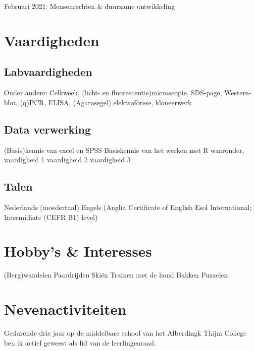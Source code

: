\documentclass[
]{book}
\begin{document}
Februari 2021: Mensenrechten \& duurzame ontwikkeling

\hypertarget{vaardigheden}{%
\section{Vaardigheden}\label{vaardigheden}}

\hypertarget{labvaardigheden}{%
\subsection{Labvaardigheden}\label{labvaardigheden}}

Onder andere:
Celkweek, (licht- en fluorescentie)microscopie, SDS-page, Western-blot, (q)PCR, ELISA, (Agarosegel) elektroforese, kloneerwerk

\hypertarget{data-verwerking}{%
\subsection{Data verwerking}\label{data-verwerking}}

(Basis)kennis van excel en SPSS
Basiskennis van het werken met R waaronder,
vaardigheid 1
vaardigheid 2
vaardigheid 3

\hypertarget{talen}{%
\subsection{Talen}\label{talen}}

Nederlands (moedertaal)
Engels (Anglia Certificate of English Esol International; Intermidiate (CEFR B1) level)

\hypertarget{hobbys-interesses}{%
\section{Hobby's \& Interesses}\label{hobbys-interesses}}

(Berg)wandelen
Paardrijden
Skiën
Trainen met de hond
Bakken
Puzzelen

\hypertarget{nevenactiviteiten}{%
\section{Nevenactiviteiten}\label{nevenactiviteiten}}

Gedurende drie jaar op de middelbare school van het Alberdingk Thijm College ben ik actief geweest als lid van de leerlingenraad.
\end{document}
